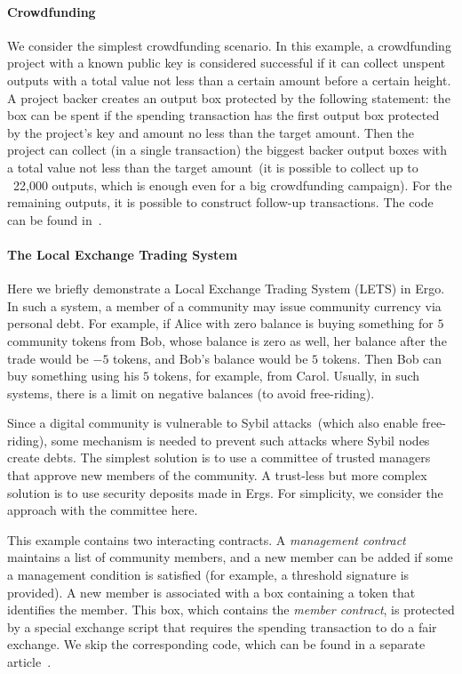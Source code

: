 \paragraph{Crowdfunding}

 We consider the simplest crowdfunding scenario. In this example, a crowdfunding project with a known public key is considered successful if it can collect unspent outputs with a total value not less than a certain amount before a certain height. A project backer creates an output box protected by the following statement: the box can be spent
 if the spending transaction has the first output box protected by the project's key and amount no less than the target amount.
 Then the project can collect (in a single transaction) the biggest backer output boxes with a total value not less than the target amount~(it is possible to collect up to ~22,000 outputs, which is
 enough even for a big crowdfunding campaign). For the remaining outputs, it is possible to construct follow-up transactions. The code can be found in~\cite{ergoTutorial}.

\paragraph{The Local Exchange Trading System}

 Here we briefly demonstrate a Local Exchange Trading System (LETS) in Ergo. In such a system, a member of a community may issue community currency via personal debt. For example, if Alice with zero balance is buying something for $5$
 community tokens from Bob, whose balance is zero as well, her balance after the trade would be $-5$ tokens, and
 Bob's balance would be $5$ tokens. Then Bob can buy something using his $5$ tokens, for example, from Carol.
 Usually, in such systems, there is a limit on negative balances (to avoid free-riding).

 Since a digital community is vulnerable to Sybil attacks~(which also enable free-riding), some mechanism is needed to prevent such attacks where Sybil nodes create debts. 
 The simplest solution is to use a committee of trusted managers that approve new members of the community. A trust-less but more complex solution is to use security deposits made in Ergs. For simplicity, we consider the approach with the committee here.
 

 This example contains two interacting contracts. A {\em management contract} maintains a list of community members, and a new member can be added if some a management condition is satisfied  (for example, a threshold
 signature is provided). A new member is associated with a box containing a token that identifies the member. This box, which contains the {\em member contract}, is protected by a special exchange script that requires the spending transaction to do a fair exchange.
 We skip the corresponding code, which can be found in a separate article~\cite{letsTutorial}.
 
